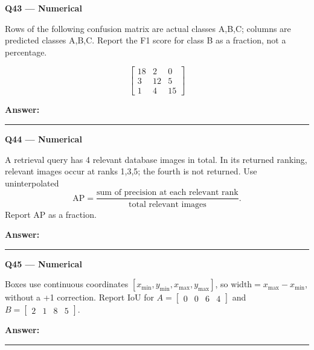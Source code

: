 \documentclass[11pt,a4paper]{article}
\begin{document}
\par\vspace{12pt}
\begin{minipage}{\linewidth}
\textbf{Q43 — Numerical}\par\smallskip
Rows of the following confusion matrix are actual classes A,\allowbreak{}B,\allowbreak{}C; columns are predicted classes A,\allowbreak{}B,\allowbreak{}C. Report the F1 score for class B as a fraction,\allowbreak{} not a percentage.


\[
\begin{bmatrix}18&2&0\\3&12&5\\1&4&15\end{bmatrix}
\]

\par\medskip\textbf{Answer:} \rule{55mm}{0.4pt}
\end{minipage}
\par\vspace{12pt}
\begin{minipage}{\linewidth}
\textbf{Q44 — Numerical}\par\smallskip
A retrieval query has 4 relevant database images in total. In its returned ranking,\allowbreak{} relevant images occur at ranks 1,\allowbreak{}3,\allowbreak{}5; the fourth is not returned. Use uninterpolated
\[\mathrm{AP}=\frac{\text{sum of precision at each relevant rank}}{\text{total relevant images}}.\]
 Report AP as a fraction.
\par\medskip\textbf{Answer:} \rule{55mm}{0.4pt}
\end{minipage}
\par\vspace{12pt}
\begin{minipage}{\linewidth}
\textbf{Q45 — Numerical}\par\smallskip
Boxes use continuous coordinates \([x_{\min},y_{\min},x_{\max},y_{\max}]\),\allowbreak{} so \(\text{width}=x_{\max}-x_{\min}\),\allowbreak{} without a +1 correction. Report IoU for \(A=\begin{bmatrix}0&0&6&4\end{bmatrix}\) and \(B=\begin{bmatrix}2&1&8&5\end{bmatrix}\).
\par\medskip\textbf{Answer:} \rule{55mm}{0.4pt}
\end{minipage}
\par\vspace{12pt}
\end{document}
